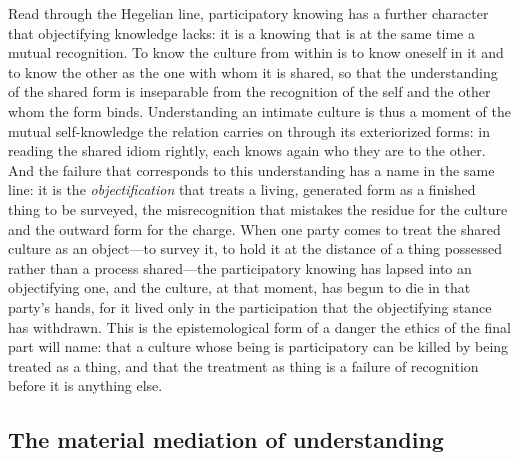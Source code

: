 Read through the Hegelian line, participatory knowing has a further character that objectifying knowledge lacks: it is a knowing that is at the same time a mutual recognition. To know the culture from within is to know oneself in it and to know the other as the one with whom it is shared, so that the understanding of the shared form is inseparable from the recognition of the self and the other whom the form binds. Understanding an intimate culture is thus a moment of the mutual self-knowledge the relation carries on through its exteriorized forms: in reading the shared idiom rightly, each knows again who they are to the other. And the failure that corresponds to this understanding has a name in the same line: it is the \emph{objectification} that treats a living, generated form as a finished thing to be surveyed, the misrecognition that mistakes the residue for the culture and the outward form for the charge. When one party comes to treat the shared culture as an object---to survey it, to hold it at the distance of a thing possessed rather than a process shared---the participatory knowing has lapsed into an objectifying one, and the culture, at that moment, has begun to die in that party's hands, for it lived only in the participation that the objectifying stance has withdrawn. This is the epistemological form of a danger the ethics of the final part will name: that a culture whose being is participatory can be killed by being treated as a thing, and that the treatment as thing is a failure of recognition before it is anything else.

\subsection*{The material mediation of understanding}

